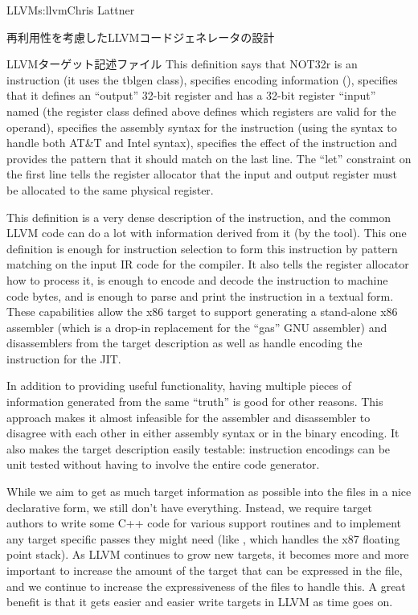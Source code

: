 \begin{aosachapter}{LLVM}{s:llvm}{Chris Lattner}
\begin{aosasect1}{再利用性を考慮したLLVMコードジェネレータの設計}
\begin{aosasect2}{LLVMターゲット記述ファイル}
\noindent This definition says that NOT32r is an instruction (it uses the
 tblgen class), specifies encoding information (), specifies that it defines an ``output'' 32-bit register
 and has a 32-bit register ``input'' named 
(the  register class defined above defines which registers
are valid for the operand), specifies the assembly syntax for the
instruction (using the \code{\{\}} syntax to handle both AT\&T and
Intel syntax), specifies the effect of the instruction and provides
the pattern that it should match on the last line.  The ``let''
constraint on the first line tells the register allocator that the
input and output register must be allocated to the same physical
register.

This definition is a very dense description of the instruction, and
the common LLVM code can do a lot with information derived from it (by
the  tool).  This one definition is enough for
instruction selection to form this instruction by pattern matching on
the input IR code for the compiler.  It also tells the register allocator how
to process it, is enough to encode and decode the instruction to
machine code bytes, and is enough to parse and print the instruction
in a textual form.  These capabilities allow the x86 target to support
generating a stand-alone x86 assembler (which is a drop-in replacement
for the ``gas'' GNU assembler) and disassemblers from the target
description as well as handle encoding the instruction for the JIT.

In addition to providing useful functionality, having multiple pieces
of information generated from the same ``truth'' is good for other
reasons.  This approach makes it almost infeasible for the assembler
and disassembler to disagree with each other in either assembly syntax
or in the binary encoding.  It also makes the target description
easily testable: instruction encodings can be unit tested without
having to involve the entire code generator.

While we aim to get as much target information as possible into the
 files in a nice declarative form, we still don't have
everything. Instead, we require target authors to write some C++ code
for various support routines and to implement any target specific
passes they might need (like , which
handles the x87 floating point stack).  As LLVM continues to grow new
targets, it becomes more and more important to increase the amount of
the target that can be expressed in the  file, and we
continue to increase the expressiveness of the  files to
handle this.  A great benefit is that it gets easier and easier write
targets in LLVM as time goes on.


\end{aosasect2}
\end{aosasect1}
\end{aosachapter}
